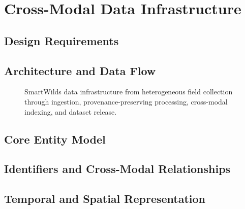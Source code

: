 \documentclass[manuscript]{acmart}
\begin{document}
\section{Cross-Modal Data Infrastructure}
\label{sec:infrastructure}



\subsection{Design Requirements}


\subsection{Architecture and Data Flow}


\begin{figure}[t]
    \centering
    \caption{SmartWilds data infrastructure from heterogeneous field
    collection through ingestion, provenance-preserving processing,
    cross-modal indexing, and dataset release.}
    \label{fig:data-infrastructure}
\end{figure}

\subsection{Core Entity Model}


\subsection{Identifiers and Cross-Modal Relationships}


\subsection{Temporal and Spatial Representation}
\end{document}
